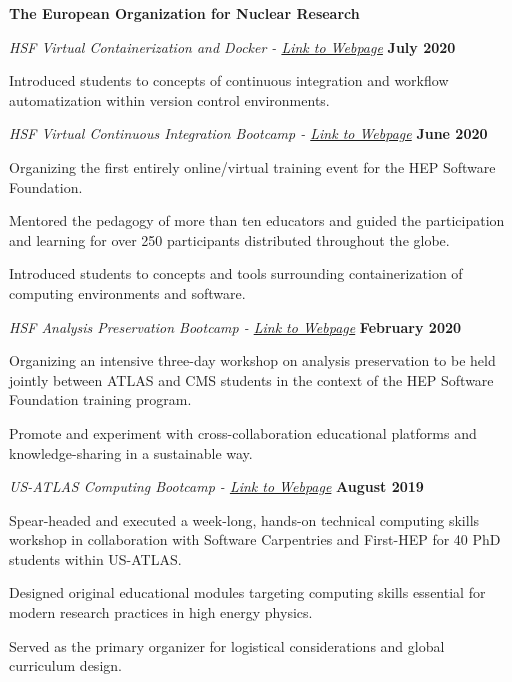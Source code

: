 \documentclass[10pt]{article}
\newenvironment{outerlist}[1][\enskip\textbullet]%
        {\begin{itemize}[#1]}{\end{itemize}%
         \vspace{-.6\baselineskip}}
\newenvironment{innerlist}[1][\enskip\textbullet]%
        {\begin{compactitem}[#1]}{\end{compactitem}}
\begin{document}
\textbf{The European Organization for Nuclear Research}
\begin{outerlist}
\item[] \textit{HSF Virtual Containerization and Docker - \href{https://indico.cern.ch/event/934651/}{Link to Webpage}}%
    \hfill \textbf{July 2020}
    \begin{innerlist}
	\item Introduced students to concepts of continuous integration and workflow automatization within version control environments.
    \end{innerlist}
\item[] \textit{HSF Virtual Continuous Integration Bootcamp - \href{https://indico.cern.ch/event/904759/}{Link to Webpage}}%
    \hfill \textbf{June 2020}
    \begin{innerlist}
	\item Organizing the first entirely online/virtual training event for the HEP Software Foundation.
	\item Mentored the pedagogy of more than ten educators and guided the participation and learning for over 250 participants distributed throughout the globe.
	\item Introduced students to concepts and tools surrounding containerization of computing environments and software.
    \end{innerlist}
\item[] \textit{HSF Analysis Preservation Bootcamp - \href{https://indico.cern.ch/event/854880/}{Link to Webpage}}%
    \hfill \textbf{February 2020}
    \begin{innerlist}
	\item Organizing an intensive three-day workshop on analysis preservation to be held jointly between ATLAS and CMS students in the context of the HEP Software Foundation training program.
        \item Promote and experiment with cross-collaboration educational platforms and knowledge-sharing in a sustainable way.
    \end{innerlist}
\item[] \textit{US-ATLAS Computing Bootcamp - \href{https://smeehan12.github.io/2019-08-19-usatlas-computing-bootcamp/}{Link to Webpage}}%
    \hfill \textbf{August 2019}
    \begin{innerlist}
	\item Spear-headed and executed a week-long, hands-on technical computing skills workshop in collaboration with Software Carpentries and First-HEP for 40 PhD students within US-ATLAS.
	 \item Designed original educational modules targeting computing skills essential for modern research practices in high energy physics.
	 \item Served as the primary organizer for logistical considerations and global curriculum design.
    \end{innerlist}
\end{outerlist}
\end{document}
